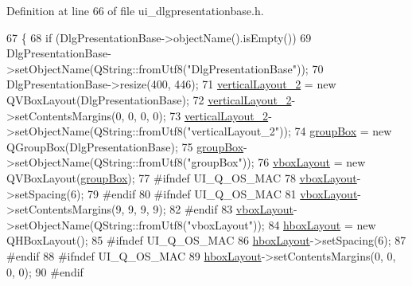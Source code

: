 Definition at line 66 of file ui\+\_\+dlgpresentationbase.\+h.


\begin{DoxyCode}
67     \{
68         \textcolor{keywordflow}{if} (DlgPresentationBase->objectName().isEmpty())
69             DlgPresentationBase->setObjectName(QString::fromUtf8(\textcolor{stringliteral}{"DlgPresentationBase"}));
70         DlgPresentationBase->resize(400, 446);
71         \hyperlink{classUi__DlgPresentationBase_a3a84b15d28c24f8e1ae84d6c5c322290}{verticalLayout\_2} = \textcolor{keyword}{new} QVBoxLayout(DlgPresentationBase);
72         \hyperlink{classUi__DlgPresentationBase_a3a84b15d28c24f8e1ae84d6c5c322290}{verticalLayout\_2}->setContentsMargins(0, 0, 0, 0);
73         \hyperlink{classUi__DlgPresentationBase_a3a84b15d28c24f8e1ae84d6c5c322290}{verticalLayout\_2}->setObjectName(QString::fromUtf8(\textcolor{stringliteral}{"verticalLayout\_2"}));
74         \hyperlink{classUi__DlgPresentationBase_a32e91831bba9e18b1bd040f092d18f7a}{groupBox} = \textcolor{keyword}{new} QGroupBox(DlgPresentationBase);
75         \hyperlink{classUi__DlgPresentationBase_a32e91831bba9e18b1bd040f092d18f7a}{groupBox}->setObjectName(QString::fromUtf8(\textcolor{stringliteral}{"groupBox"}));
76         \hyperlink{classUi__DlgPresentationBase_abe419761379b787b35d2508302b75d1b}{vboxLayout} = \textcolor{keyword}{new} QVBoxLayout(\hyperlink{classUi__DlgPresentationBase_a32e91831bba9e18b1bd040f092d18f7a}{groupBox});
77 \textcolor{preprocessor}{#ifndef UI\_Q\_OS\_MAC}
78         \hyperlink{classUi__DlgPresentationBase_abe419761379b787b35d2508302b75d1b}{vboxLayout}->setSpacing(6);
79 \textcolor{preprocessor}{#endif}
80 \textcolor{preprocessor}{#ifndef UI\_Q\_OS\_MAC}
81         \hyperlink{classUi__DlgPresentationBase_abe419761379b787b35d2508302b75d1b}{vboxLayout}->setContentsMargins(9, 9, 9, 9);
82 \textcolor{preprocessor}{#endif}
83         \hyperlink{classUi__DlgPresentationBase_abe419761379b787b35d2508302b75d1b}{vboxLayout}->setObjectName(QString::fromUtf8(\textcolor{stringliteral}{"vboxLayout"}));
84         \hyperlink{classUi__DlgPresentationBase_a768dd80243404f4b784802baae0d8b12}{hboxLayout} = \textcolor{keyword}{new} QHBoxLayout();
85 \textcolor{preprocessor}{#ifndef UI\_Q\_OS\_MAC}
86         \hyperlink{classUi__DlgPresentationBase_a768dd80243404f4b784802baae0d8b12}{hboxLayout}->setSpacing(6);
87 \textcolor{preprocessor}{#endif}
88 \textcolor{preprocessor}{#ifndef UI\_Q\_OS\_MAC}
89         \hyperlink{classUi__DlgPresentationBase_a768dd80243404f4b784802baae0d8b12}{hboxLayout}->setContentsMargins(0, 0, 0, 0);
90 \textcolor{preprocessor}{#endif}

\end{DoxyCode}
